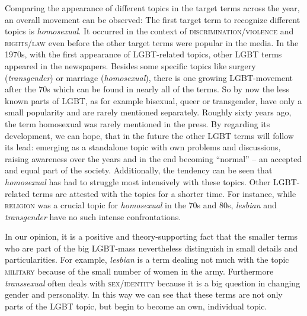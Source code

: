 \documentclass[10pt,a4paper,twocolumn]{scrartcl}
\begin{document}
Comparing the appearance of different topics in the target terms across the year, an overall movement can be observed: The first target term to recognize different topics is \textit{homosexual}. It occurred in the context of \textsc{discrimination/violence} and \textsc{rights/law} even before the other target terms were popular in the media. In the 1970s, with the first appearance of LGBT-related topics, other LGBT terms appeared in the newspapers. Besides some specific topics like surgery (\textit{transgender}) or marriage (\textit{homosexual}), there is one growing LGBT-movement after the 70s which can be found in nearly all of the terms. So by now the less known parts of LGBT, as for example bisexual, queer or transgender, have only a small popularity and are rarely mentioned separately. Roughly sixty years ago, the term homosexual was rarely mentioned in the press. By regarding its development, we can hope, that in the future the other LGBT terms will follow its lead: emerging as a standalone topic with own problems and discussions, raising awareness over the years and in the end becoming ``normal'' -- an accepted and equal part of the society. Additionally, the tendency can be seen that \textit{homosexual} has had to struggle most intensively with these topics. Other LGBT-related terms are attested with the topics for a shorter time. For instance, while \textsc{religion} was a crucial topic for \textit{homosexual} in the 70s and 80s, \textit{lesbian} and \textit{transgender} have no such intense confrontations.

In our opinion, it is a positive and theory-supporting fact that the smaller terms who are part of the big LGBT-mass nevertheless distinguish in small details and particularities. For example, \textit{lesbian} is a term dealing not much with the topic \textsc{military} because of the small number of women in the army. Furthermore \textit{transsexual} often deals with \textsc{sex/identity} because it is a big question in changing gender and personality. In this way we can see that these terms are not only parts of the LGBT topic, but begin to become an own, individual topic.
\end{document}
